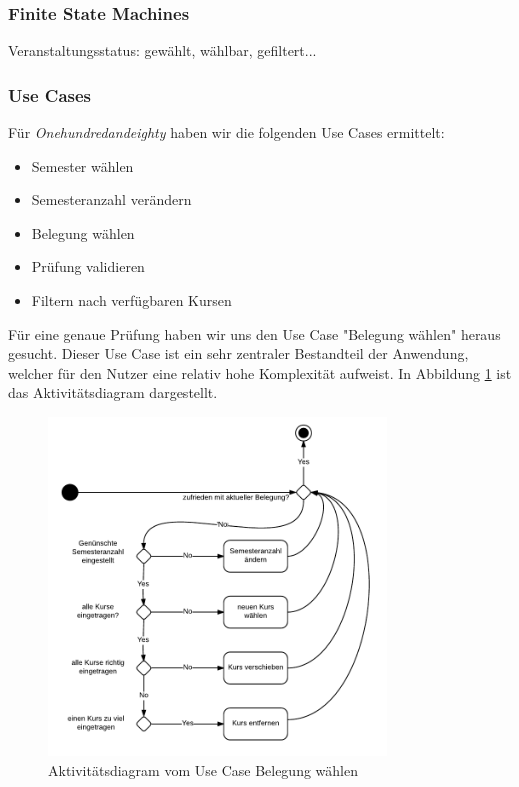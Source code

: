 \documentclass[ngerman]{article}
\begin{document}
\subsubsection{Finite State Machines}
Veranstaltungsstatus: gewählt, wählbar, gefiltert...


\subsubsection{Use Cases}
Für \emph{Onehundredandeighty} haben wir die folgenden Use Cases ermittelt:

\begin{itemize}
    \item Semester wählen
    \item Semesteranzahl verändern
    \item Belegung wählen
    \item Prüfung validieren
    \item Filtern nach verfügbaren Kursen
\end{itemize}

Für eine genaue Prüfung haben wir uns den Use Case "Belegung wählen" heraus gesucht. Dieser Use Case ist ein sehr zentraler Bestandteil der Anwendung, welcher für den Nutzer eine relativ hohe Komplexität aufweist. In Abbildung \ref{fig:graph_belegung_waehlen} ist das Aktivitätsdiagram dargestellt.

\begin{figure}
\includegraphics[width=0.8\textwidth]{figures/180_Belegungaendern_aktivitaet.pdf}
\caption{Aktivitätsdiagram vom Use Case Belegung wählen}
\label{fig:graph_belegung_waehlen}
\end{figure}
\end{document}
